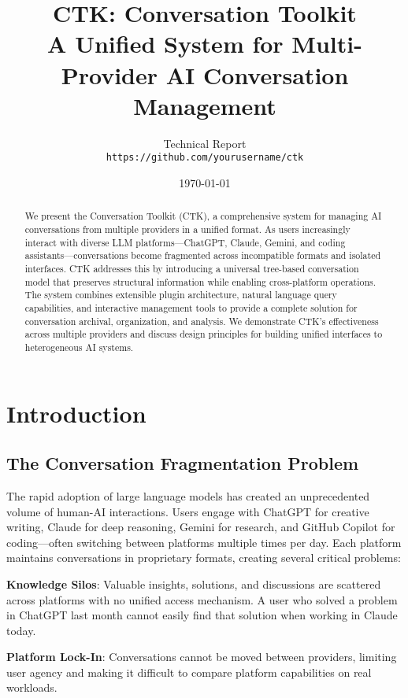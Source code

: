 \documentclass[11pt,letterpaper]{article}
\title{
    \textbf{CTK: Conversation Toolkit}\\
    \large A Unified System for Multi-Provider AI Conversation Management
}
\author{
    Technical Report\\
    \texttt{https://github.com/yourusername/ctk}
}
\date{\today}
\begin{document}
\maketitle

\begin{abstract}
We present the Conversation Toolkit (CTK), a comprehensive system for managing AI conversations from multiple providers in a unified format. As users increasingly interact with diverse LLM platforms---ChatGPT, Claude, Gemini, and coding assistants---conversations become fragmented across incompatible formats and isolated interfaces. CTK addresses this by introducing a universal tree-based conversation model that preserves structural information while enabling cross-platform operations. The system combines extensible plugin architecture, natural language query capabilities, and interactive management tools to provide a complete solution for conversation archival, organization, and analysis. We demonstrate CTK's effectiveness across multiple providers and discuss design principles for building unified interfaces to heterogeneous AI systems.
\end{abstract}

\tableofcontents
\newpage

\section{Introduction}

\subsection{The Conversation Fragmentation Problem}

The rapid adoption of large language models has created an unprecedented volume of human-AI interactions. Users engage with ChatGPT for creative writing, Claude for deep reasoning, Gemini for research, and GitHub Copilot for coding---often switching between platforms multiple times per day. Each platform maintains conversations in proprietary formats, creating several critical problems:

\textbf{Knowledge Silos}: Valuable insights, solutions, and discussions are scattered across platforms with no unified access mechanism. A user who solved a problem in ChatGPT last month cannot easily find that solution when working in Claude today.

\textbf{Platform Lock-In}: Conversations cannot be moved between providers, limiting user agency and making it difficult to compare platform capabilities on real workloads.
\end{document}
